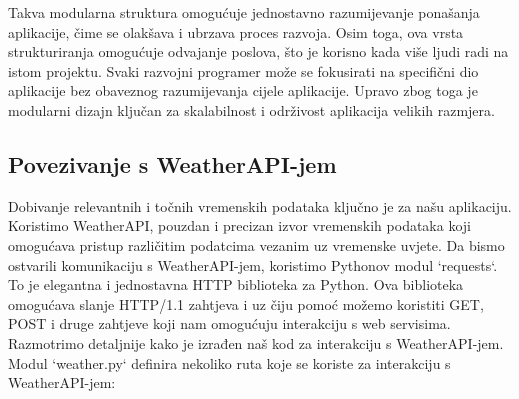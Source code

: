 \documentclass[times, utf8, zavrsni]{fer}
\begin{document}
Takva modularna struktura omogućuje jednostavno razumijevanje ponašanja aplikacije, čime se olakšava i ubrzava proces razvoja. Osim toga, ova vrsta strukturiranja omogućuje odvajanje poslova, što je korisno kada više ljudi radi na istom projektu. Svaki razvojni programer može se fokusirati na specifični dio aplikacije bez obaveznog razumijevanja cijele aplikacije. Upravo zbog toga je modularni dizajn ključan za skalabilnost i održivost aplikacija velikih razmjera.

\newpage
\subsection{Povezivanje s WeatherAPI-jem}

Dobivanje relevantnih i točnih vremenskih podataka ključno je za našu aplikaciju. Koristimo WeatherAPI, pouzdan i precizan izvor vremenskih podataka koji omogućava pristup različitim podatcima vezanim uz vremenske uvjete. Da bismo ostvarili komunikaciju s WeatherAPI-jem, koristimo Pythonov modul `requests`. To je elegantna i jednostavna HTTP biblioteka za Python. Ova biblioteka omogućava slanje HTTP/1.1 zahtjeva i uz čiju pomoć možemo koristiti GET, POST i druge zahtjeve koji nam omogućuju interakciju s web servisima. Razmotrimo detaljnije kako je izrađen naš kod za interakciju s WeatherAPI-jem. Modul `weather.py` definira nekoliko ruta koje se koriste za interakciju s WeatherAPI-jem:
\end{document}
